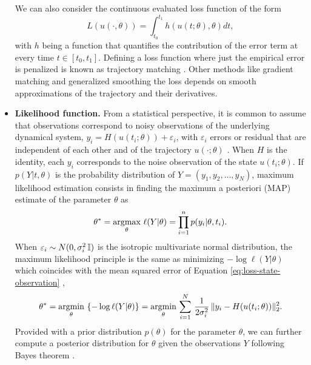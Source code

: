 \begin{itemize}
\begin{equation}
    \end{equation}
    We can also consider the continuous evaluated loss function of the form
    \begin{equation}
         L(u(\cdot, \theta)) = \int_{t_0}^{t_1} h( u(t;\theta), \theta)  dt, 
         \label{eq:integrated-loss-function}
    \end{equation}
    with $h$ being a function that quantifies the contribution of the error term at every time $t \in [t_0, t_1]$. 
    Defining a loss function where just the empirical error is penalized is known as trajectory matching \cite{ramsay2017dynamic}. 
    Other methods like gradient matching and generalized smoothing the loss depends on smooth approximations of the trajectory and their derivatives. 
    \item \textbf{Likelihood function.} From a statistical perspective, it is common to assume that observations correspond to noisy observations of the underlying dynamical system, $y_i = H(u(t_i; \theta)) + \varepsilon_i$, with $\varepsilon_i$ errors or residual that are independent of each other and of the trajectory $u(\cdot ; \theta)$ \cite{ramsay2017dynamic}.
    When $H$ is the identity, each $y_i$ corresponds to the noise observation of the state $u(t_i; \theta)$.
    If $p(Y | t , \theta)$ is the probability distribution of $Y=(y_1, y_2, \ldots, y_N)$, maximum likelihood estimation consists in finding the maximum a posteriori (MAP) estimate of the parameter $\theta$ as
    \begin{equation}
        \theta^* 
        = 
        \underset{\theta}{\text{argmax}} \,\, \ell (Y | \theta) 
        = 
        \prod_{i=1}^n p(y_i | \theta, t_i) .
    \end{equation}
    When $\varepsilon_i \sim N(0, \sigma_i^2 \operatorname{\mathbb{I}})$ is the isotropic multivariate normal distribution, the maximum likelihood principle is the same as minimizing $- \log \ell(Y | \theta)$ which coincides with the mean squared error of Equation \eqref{eq:loss-state-observation} \cite{hastie2009elements},
    \begin{equation}
        \theta^* 
        = 
        \underset{\theta}{\text{argmin}} \, \left \{ - \log \ell (Y | \theta) \right \}
        = 
        \underset{\theta}{\text{argmin}} \, \sum_{i=1}^N 
        \, \frac{1}{2\sigma_i^2} \,
        \| y_i - H(u(t_i; \theta)) \|_2^2 .
    \end{equation}
    Provided with a prior distribution $p(\theta)$ for the parameter $\theta$, we can further compute a posterior distribution for $\theta$ given the observations $Y$ following Bayes theorem \cite{pml1Book}.

\end{itemize}
